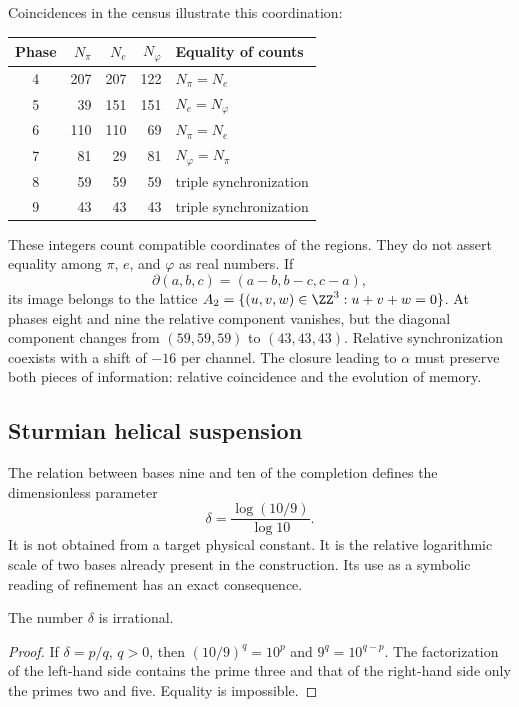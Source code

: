 Coincidences in the census illustrate this coordination:
\begin{center}
\begin{tabular}{@{}c rrr l@{}}\toprule
Phase&\(N_\pi\)&\(N_e\)&\(N_\varphi\)&Equality of counts\\\midrule
4&207&207&122&\(N_\pi=N_e\)\\
5&39&151&151&\(N_e=N_\varphi\)\\
6&110&110&69&\(N_\pi=N_e\)\\
7&81&29&81&\(N_\varphi=N_\pi\)\\
8&59&59&59&triple synchronization\\
9&43&43&43&triple synchronization\\\bottomrule
\end{tabular}
\end{center}
These integers count compatible coordinates of the regions. They do not assert equality among \(\pi\), \(e\), and \(\varphi\) as real numbers. If
\[
 \partial(a,b,c)=(a-b,b-c,c-a),
\]
its image belongs to the lattice \(A_2=\{(u,v,w)\in\ZZ^3:u+v+w=0\}\). At phases eight and nine the relative component vanishes, but the diagonal component changes from \((59,59,59)\) to \((43,43,43)\). Relative synchronization coexists with a shift of \(-16\) per channel. The closure leading to \(\alpha\) must preserve both pieces of information: relative coincidence and the evolution of memory.

\subsection{Sturmian helical suspension}

The relation between bases nine and ten of the completion defines the dimensionless parameter
\begin{equation}
 \delta=\frac{\log(10/9)}{\log10}.
 \label{eq:delta-sturm}
\end{equation}
It is not obtained from a target physical constant. It is the relative logarithmic scale of two bases already present in the construction. Its use as a symbolic reading of refinement has an exact consequence.

\begin{lemma}
The number \(\delta\) is irrational.
\end{lemma}
\begin{proof}
If \(\delta=p/q\), \(q>0\), then \((10/9)^q=10^p\) and \(9^q=10^{q-p}\). The factorization of the left-hand side contains the prime three and that of the right-hand side only the primes two and five. Equality is impossible.
\end{proof}

